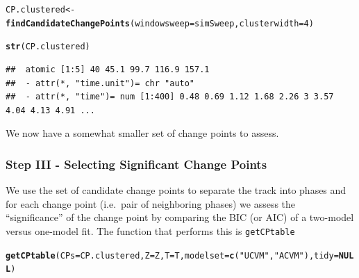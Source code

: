 \documentclass[10pt]{article}\usepackage[]{graphicx}\usepackage[]{color}
\makeatletter
\newcommand{\hlnum}[1]{\textcolor[rgb]{0.686,0.059,0.569}{#1}}%
\newcommand{\hlstr}[1]{\textcolor[rgb]{0.192,0.494,0.8}{#1}}%
\newcommand{\hlstd}[1]{\textcolor[rgb]{0.345,0.345,0.345}{#1}}%
\newcommand{\hlkwa}[1]{\textcolor[rgb]{0.161,0.373,0.58}{\textbf{#1}}}%
\newcommand{\hlkwb}[1]{\textcolor[rgb]{0.69,0.353,0.396}{#1}}%
\newcommand{\hlkwc}[1]{\textcolor[rgb]{0.333,0.667,0.333}{#1}}%
\newcommand{\hlkwd}[1]{\textcolor[rgb]{0.737,0.353,0.396}{\textbf{#1}}}%
\newenvironment{kframe}{%
 \def\at@end@of@kframe{}%
 \ifinner\ifhmode%
  \def\at@end@of@kframe{\end{minipage}}%
  \begin{minipage}{\columnwidth}%
 \fi\fi%
 \def\FrameCommand##1{\hskip\@totalleftmargin \hskip-\fboxsep
 \colorbox{shadecolor}{##1}\hskip-\fboxsep
     \hskip-\linewidth \hskip-\@totalleftmargin \hskip\columnwidth}%
 \MakeFramed {\advance\hsize-\width
   \@totalleftmargin\z@ \linewidth\hsize
   \@setminipage}}%
 {\par\unskip\endMakeFramed%
 \at@end@of@kframe}
\newenvironment{knitrout}{}{} %
\makeatother
\begin{document}
\begin{knitrout}
\color{fgcolor}\begin{kframe}
\begin{alltt}
\hlstd{CP.clustered} \hlkwb{<-} \hlkwd{findCandidateChangePoints}\hlstd{(}\hlkwc{windowsweep} \hlstd{= simSweep,} \hlkwc{clusterwidth} \hlstd{=} \hlnum{4}\hlstd{)}
\end{alltt}


{\ttfamily\noindent\itshape\color{messagecolor}{\#\# Note: clustering candidate change points at 4 time units collapsed 6 candidate change points to 5 change points.}}\begin{alltt}
\hlkwd{str}\hlstd{(CP.clustered)}
\end{alltt}
\begin{verbatim}
##  atomic [1:5] 40 45.1 99.7 116.9 157.1
##  - attr(*, "time.unit")= chr "auto"
##  - attr(*, "time")= num [1:400] 0.48 0.69 1.12 1.68 2.26 3 3.57 4.04 4.13 4.91 ...
\end{verbatim}
\end{kframe}
\end{knitrout}

\noindent We now have a somewhat smaller set of change points to assess.  

\subsubsection{Step III - Selecting Significant Change Points}  

We use the set of candidate change points to separate the track into phases and for each change point (i.e.~pair of neighboring phases) we assess the ``significance'' of the change point by comparing the BIC (or AIC) of a two-model versus one-model fit.  The function that performs this is \texttt{getCPtable}

\begin{knitrout}
\color{fgcolor}\begin{kframe}
\begin{alltt}
\hlkwd{getCPtable}\hlstd{(}\hlkwc{CPs} \hlstd{= CP.clustered,} \hlkwc{Z} \hlstd{= Z,} \hlkwc{T} \hlstd{= T,} \hlkwc{modelset} \hlstd{=} \hlkwd{c}\hlstd{(}\hlstr{"UCVM"}\hlstd{,} \hlstr{"ACVM"}\hlstd{),} \hlkwc{tidy} \hlstd{=} \hlkwa{NULL}\hlstd{)}
\end{alltt}


{\ttfamily\noindent\color{warningcolor}{\#\# Warning in min(i1): no non-missing arguments to min; returning Inf}}

{\ttfamily\noindent\color{warningcolor}{\#\# Warning in max(i2): no non-missing arguments to max; returning -Inf}}

{\ttfamily\noindent\bfseries\color{errorcolor}{\#\# Error in min(i1):max(i2): result would be too long a vector}}\end{kframe}
\end{knitrout}
\end{document}

